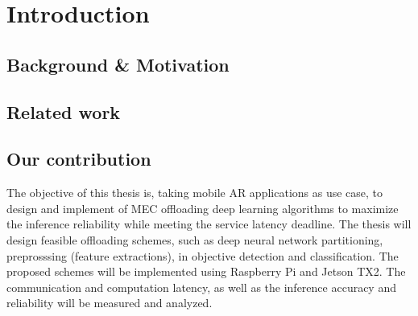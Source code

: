 \hypertarget{inroduction}{%
\chapter{Introduction}\label{sec:introduction}}
\thispagestyle{fancy}

\section{Background \& Motivation}

\blindtext {}

\section{Related work}



\blindtext

\section{Our contribution}


The objective of this thesis is, taking mobile AR applications as use case, to design and implement of MEC offloading deep learning algorithms to maximize the inference reliability while meeting the service latency deadline. The thesis will design feasible offloading schemes, such as deep neural network partitioning, preprosssing (feature extractions), in objective detection and classification. The proposed schemes will be implemented using Raspberry Pi and Jetson TX2. The communication and computation latency, as well as the inference accuracy and reliability will be measured and analyzed.


